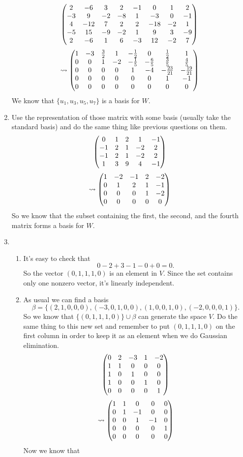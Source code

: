 \begin{enumerate}
\[\begin{pmatrix}2 & -6 & 3 & 2 & -1 & 0 & 1 & 2\cr -3 & 9 & -2 & -8 & 1 & -3 & 0 & -1\cr 4 & -12 & 7 & 2 & 2 & -18 & -2 & 1\cr -5 & 15 & -9 & -2 & 1 & 9 & 3 & -9\cr 2 & -6 & 1 & 6 & -3 & 12 & -2 & 7\end{pmatrix}\]
\[\rightsquigarrow \begin{pmatrix}1 & -3 & \frac{3}{2} & 1 & -\frac{1}{2} & 0 & \frac{1}{2} & 1\cr 0 & 0 & 1 & -2 & -\frac{1}{5} & -\frac{6}{5} & \frac{3}{5} & \frac{4}{5}\cr 0 & 0 & 0 & 0 & 1 & -4 & -\frac{23}{21} & -\frac{19}{21}\cr 0 & 0 & 0 & 0 & 0 & 0 & 1 & -1\cr 0 & 0 & 0 & 0 & 0 & 0 & 0 & 0\end{pmatrix}\]
We know that $\{u_1,u_3,u_5,u_7\}$ is a basis for $W$.
\item Use the representation of those matrix with some basis (usually take the standard basis) and do the same thing like previous questions on them.
\[\begin{pmatrix}0 & 1 & 2 & 1 & -1\cr -1 & 2 & 1 & -2 & 2\cr -1 & 2 & 1 & -2 & 2\cr 1 & 3 & 9 & 4 & -1\end{pmatrix}\]
\[\rightsquigarrow \begin{pmatrix}1 & -2 & -1 & 2 & -2\cr 0 & 1 & 2 & 1 & -1\cr 0 & 0 & 0 & 1 & -2\cr 0 & 0 & 0 & 0 & 0\end{pmatrix}\]
So we know that the subset containing the first, the second, and the fourth matrix forms a basis for $W$.
\item \begin{enumerate}
\item It's easy to check that 
\[0-2+3-1-0+0=0.\]
So the vector $(0,1,1,1,0)$ is an element in $V$. Since the set contains only one nonzero vector, it's linearly independent.
\item As usual we can find a basis 
\[\beta =\{(2,1,0,0,0),(-3,0,1,0,0),(1,0,0,1,0),(-2,0,0,0,1)\}.\] So we know that $\{(0,1,1,1,0)\}\cup \beta $ can generate the space $V$. Do the same thing to this new set and remember to put $(0,1,1,1,0)$ on the first column in order to keep it as an element when we do Gaussian elimination.
\[\begin{pmatrix}0 & 2 & -3 & 1 & -2\cr 1 & 1 & 0 & 0 & 0\cr 1 & 0 & 1 & 0 & 0\cr 1 & 0 & 0 & 1 & 0\cr 0 & 0 & 0 & 0 & 1\end{pmatrix}\]
\[\rightsquigarrow \begin{pmatrix}1 & 1 & 0 & 0 & 0\cr 0 & 1 & -1 & 0 & 0\cr 0 & 0 & 1 & -1 & 0\cr 0 & 0 & 0 & 0 & 1\cr 0 & 0 & 0 & 0 & 0\end{pmatrix}\]
Now we know that 

\end{enumerate}
\end{enumerate}
